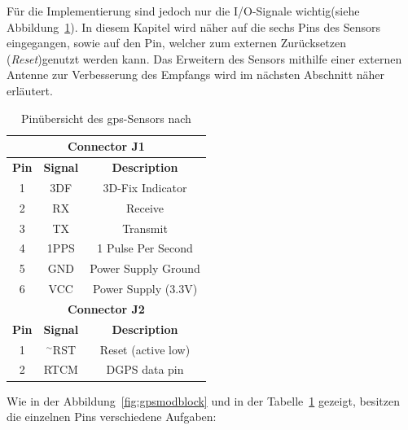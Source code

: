 Für die Implementierung sind jedoch nur die I/O-Signale wichtig(siehe Abbildung~\ref{tab:gpsmodtable}).
In diesem Kapitel wird näher auf die sechs Pins des Sensors eingegangen, sowie auf den Pin, welcher zum externen
Zurücksetzen (\emph{Reset})genutzt werden kann. Das Erweitern des Sensors mithilfe einer externen Antenne
zur Verbesserung des Empfangs wird im nächsten Abschnitt näher erläutert.\\

\begin{table}[h!]
\centering
\scriptsize
\begin{tabular}{c|c|c}
\toprule
\multicolumn{3}{c}{\textbf{Connector J1}}\\
\midrule
\centering
\textbf{Pin} & \textbf{Signal} & \textbf{Description}  \\
\hline
1 & 3DF & 3D-Fix Indicator \\
\hline
2 & RX & Receive  \\
\hline
3 & TX & Transmit  \\
\hline
4 & 1PPS & 1 Pulse Per Second \\
\hline
5 & GND & Power Supply Ground \\
\hline
6 & VCC & Power Supply (3.3V) \\
\toprule
\multicolumn{3}{c}{\textbf{Connector J2}}\\
\midrule
\centering
\textbf{Pin} & \textbf{Signal} & \textbf{Description}  \\
\hline
1 & \(^\sim\)RST & Reset (active low) \\
\hline
2 & RTCM & DGPS data pin \\
\bottomrule
\end{tabular}
\caption{Pinübersicht des \ac{gps}-Sensors nach \cite{boardman}}
\label{tab:gpsmodtable}
\end{table}

\newpage
Wie in der Abbildung~\ref{fig:gpsmodblock} und in der Tabelle~\ref{tab:gpsmodtable} gezeigt,
besitzen die einzelnen Pins verschiedene Aufgaben:\cite{pmodgpsman}\\


